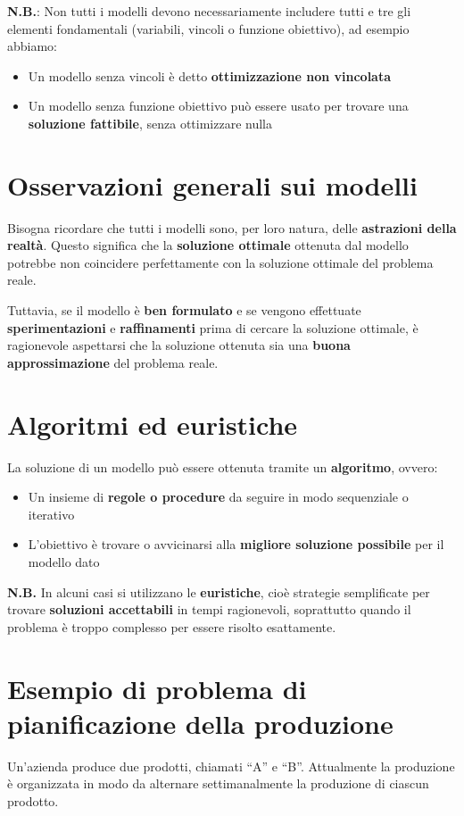\textbf{N.B.}: Non tutti i modelli devono necessariamente includere tutti e tre gli elementi fondamentali (variabili, vincoli o funzione obiettivo), ad esempio abbiamo:
\begin{itemize}
    \item Un modello senza vincoli è detto \textbf{ottimizzazione non vincolata}
    \item Un modello senza funzione obiettivo può essere usato per trovare una \textbf{soluzione fattibile}, senza ottimizzare nulla
\end{itemize}

\section{Osservazioni generali sui modelli}
Bisogna ricordare che tutti i modelli sono, per loro natura, delle \textbf{astrazioni della realtà}. Questo significa che la \textbf{soluzione ottimale} ottenuta dal modello potrebbe non coincidere perfettamente con la soluzione ottimale del problema reale.

Tuttavia, se il modello è \textbf{ben formulato} e se vengono effettuate \textbf{sperimentazioni} e \textbf{raffinamenti} prima di cercare la soluzione ottimale, è ragionevole aspettarsi che la soluzione ottenuta sia una \textbf{buona approssimazione} del problema reale.

\section{Algoritmi ed euristiche}
La soluzione di un modello può essere ottenuta tramite un \textbf{algoritmo}, ovvero:
\begin{itemize}
    \item Un insieme di \textbf{regole o procedure} da seguire in modo sequenziale o iterativo
    \item L'obiettivo è trovare o avvicinarsi alla \textbf{migliore soluzione possibile} per il modello dato
\end{itemize}

\textbf{N.B.} In alcuni casi si utilizzano le \textbf{euristiche}, cioè strategie semplificate per trovare \textbf{soluzioni accettabili} in tempi ragionevoli, soprattutto quando il problema è troppo complesso per essere risolto esattamente.

\section{Esempio di problema di pianificazione della produzione}
Un'azienda produce due prodotti, chiamati ``A'' e ``B''. Attualmente la produzione è organizzata in modo da alternare settimanalmente la produzione di ciascun prodotto.

